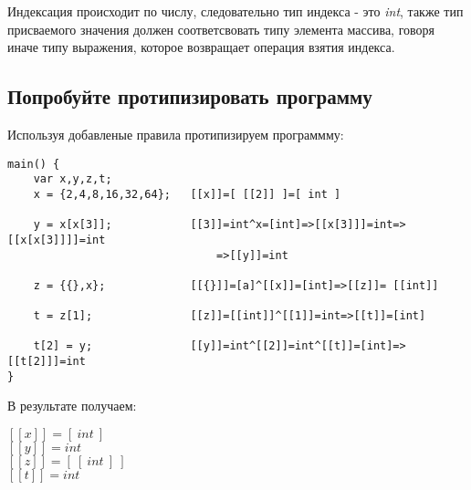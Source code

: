 \documentclass{report}
\begin{document}
Индексация происходит по числу, следовательно тип индекса - это \textit{int}, также тип присваемого значения должен соответсвовать типу элемента массива, говоря иначе типу выражения, которое возвращает операция взятия индекса.

\newpage
\subsection{Попробуйте протипизировать программу}

Используя добавленые правила протипизируем программму:

\begingroup
\begin{center}
\begin{lstlisting}
main() {
    var x,y,z,t;
    x = {2,4,8,16,32,64};   [[x]]=[ [[2]] ]=[ int ]

    y = x[x[3]];            [[3]]=int^x=[int]=>[[x[3]]]=int=>[[x[x[3]]]]=int
                                =>[[y]]=int

    z = {{},x};             [[{}]]=[a]^[[x]]=[int]=>[[z]]= [[int]]

    t = z[1];               [[z]]=[[int]]^[[1]]=int=>[[t]]=[int]

    t[2] = y;               [[y]]=int^[[2]]=int^[[t]]=[int]=>[[t[2]]]=int
}
\end{lstlisting}
\end{center}
\endgroup

В результате получаем:

\begin{center}
    \( [[x]] = [\ int\ ] \) \\
    \(  [[y]] = int \) \\
    \(  [[z]] = [\ [\ int\ ]\ ] \) \\
    \(  [[t]] = int \) \\
\end{center}
\end{document}
